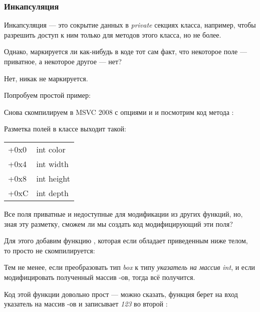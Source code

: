 \subsubsection{Инкапсуляция}

Инкапсуляция --- это сокрытие данных в \emph{private} секциях класса, например, чтобы разрешить доступ к ним только 
для методов этого класса, но не более.

Однако, маркируется ли как-нибудь в коде тот сам факт, что некоторое поле --- приватное, 
а некоторое другое --- нет?

Нет, никак не маркируется.

Попробуем простой пример:



Снова скомпилируем в MSVC 2008 с опциями \Ox и \Obzero и посмотрим код метода :



Разметка полей в классе выходит такой:

\begin{center}
\begin{tabular}{ | l | l | }
\hline
  \tableheader{} \\
\hline
  +0x0 & int color \\
\hline
  +0x4 & int width \\
\hline
  +0x8 & int height \\
\hline
  +0xC & int depth \\
\hline
\end{tabular}
\end{center}

Все поля приватные и недоступные для модификации из других функций, но, зная эту разметку, 
сможем ли мы создать код модифицирующий эти поля? 

Для этого добавим функцию , которая если обладает 
приведенным ниже телом, то просто не скомпилируется:



Тем не менее, если преобразовать тип \emph{box} к типу \emph{указатель на массив int}, 
и если модифицировать полученный массив \Tint{}-ов, тогда всё получится.



Код этой функции довольно прост --- можно сказать, функция берет на вход указатель на массив \Tint{}-ов и 
записывает \emph{123} во второй \Tint{}:

